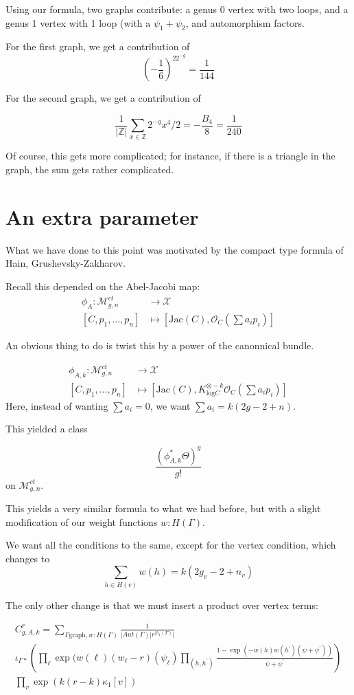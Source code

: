 \documentclass{amsart}
\theoremstyle{definition}
\newcommand{\OO}{\mathcal{O}}
\newcommand{\Z}{\mathbb{Z}}
\newcommand{\M}{\mathcal{M}}
\newcommand{\Aut}{Aut}
\begin{document}
Using our formula, two graphs contribute: a genus 0 vertex with two loops, and a genus 1 vertex with 1 loop (with a $\psi_1+\psi_2$, and automorphism factors.

For the first graph, we get a contribution of $$(-\frac{1}{6})^22^{-g}=\frac{1}{144}$$

For the second graph, we get a contribution of

$$\frac{1}{|\Z|}\sum_{x\in\Z} 2^{-g}x^4/2 =-\frac{B_4}{8}=\frac{1}{240}$$

Of course, this gets more complicated; for instance, if there is a triangle in the graph, the sum gets rather complicated.

\section{An extra parameter}

What we have done to this point was motivated by the compact type formula of Hain, Grushevsky-Zakharov.

Recall this depended on the Abel-Jacobi map:
\begin{align*}
\phi_A:\M^{ct}_{g,n}&\to\mathcal{X} \\
[C, p_1,\dots, p_n]&\mapsto [\text{Jac}(C), \OO_C(\sum a_ip_i)]
\end{align*}

An obvious thing to do is twist this by a power of the canonnical bundle.

\begin{align*}
\phi_{A,k}:\M^{ct}_{g,n}&\to\mathcal{X} \\
[C, p_1,\dots, p_n]&\mapsto [\text{Jac}(C), K^{\otimes-k}_{\text{log} C}\OO_C(\sum a_ip_i)]
\end{align*}
Here, instead of wanting $\sum a_i=0$, we want $\sum a_i=k(2g-2+n)$.

This yielded a class

$$\frac{(\phi^*_{A,k}\Theta)^g}{g!}$$
on $\M^{ct}_{g,n}$.

This yields a very similar formula to what we had before, but with a slight modification of our weight functions $w:H(\Gamma)$.

We want all the conditions to the same, except for the vertex condition, which changes to
$$\sum_{h\in H(v)} w(h)=k(2g_v-2+n_v)$$

The only other change is that we must insert a product over vertex terms:

 \begin{multline*}
C^r_{g,A,k}=\sum_{\Gamma \text{graph}, w:H(\Gamma)}\frac{1}{|\Aut(\Gamma)|r^{|h_1(\Gamma)}|}\\
 \iota_{\Gamma*}\left( \prod_{\ell} \exp(w(\ell)(w_\ell-r)(\psi_\ell) \prod_{(h,h^\prime)} \frac{1-\exp(-w(h)w(h^\prime)(\psi+\psi^\prime))}{\psi+\psi^\prime}\right) 
\\ \prod_v \exp(k(r-k)\kappa_1[v])
\end{multline*}
\end{document}
